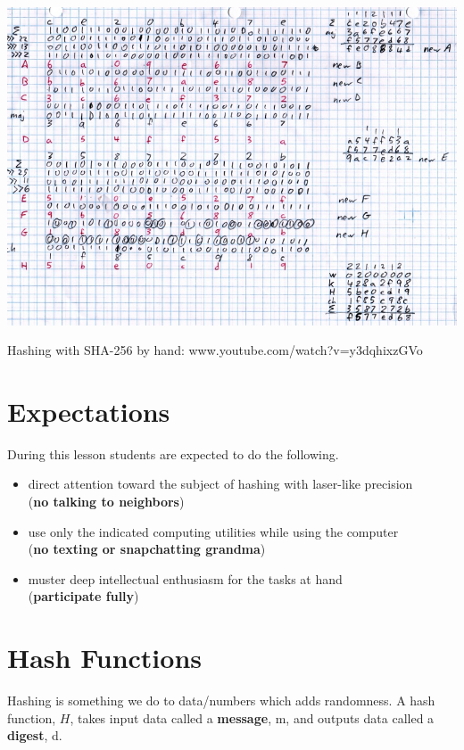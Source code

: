\documentclass{tufte-handout}
\begin{document}
\normalsize

\begin{marginfigure}[10 pt]%
  \includegraphics[width=\linewidth]{sha.jpg}
  \caption{Hashing with SHA-256 by hand: www.youtube.com/watch?v=y3dqhixzGVo}
  \label{fig:marginfig}
\end{marginfigure}

\section{Expectations}
During this lesson students are expected to do the following. 
\begin{itemize}
\item direct attention toward the subject of hashing with laser-like precision \\(\textbf{no talking to neighbors})
\item use only the indicated computing utilities while using the computer \\(\textbf{no texting or snapchatting grandma})
 \item muster deep intellectual enthusiasm for the tasks at hand\\ (\textbf{participate fully})
 \end{itemize}

\section{Hash Functions}

Hashing is something we do to data/numbers which adds randomness.  A hash function, $H$, takes input data called a \textbf{message}, m, and outputs data called a \textbf{digest}, d.  
\end{document}
